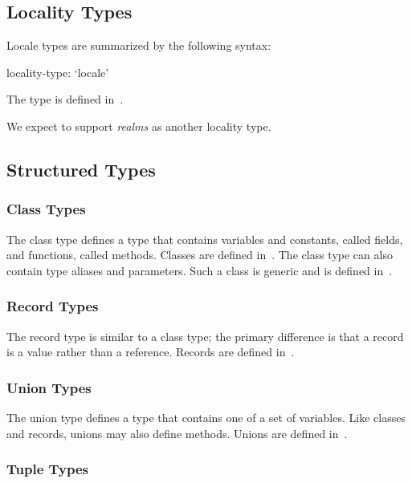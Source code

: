 \subsection{Locality Types}
\label{Locality_Types}

Locale types are summarized by the following syntax:

\begin{syntax}
locality-type:
  `locale'
\end{syntax}

The  type is defined in~.

\begin{openissue}
We expect to support \emph{realms} as another locality type.
\end{openissue}

\subsection{Structured Types}
\label{Structured_Types}

\subsubsection{Class Types}

The class type defines a type that contains variables and constants,
called fields, and functions, called methods.  Classes are defined
in~.  The class type can also contain type aliases and
parameters.  Such a class is generic and is defined
in~.

\subsubsection{Record Types}

The record type is similar to a class type; the primary difference is
that a record is a value rather than a reference.  Records are defined
in~.

\subsubsection{Union Types}

The union type defines a type that contains one of a set of variables.
Like classes and records, unions may also define methods.  Unions are
defined in~.

\subsubsection{Tuple Types}

